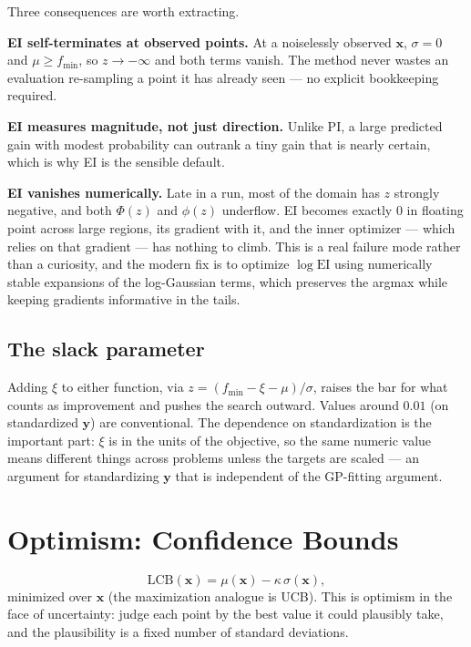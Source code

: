 \documentclass[conference]{IEEEtran}
\begin{document}
Three consequences are worth extracting.

\textbf{EI self-terminates at observed points.} At a noiselessly observed $\mathbf{x}$, $\sigma = 0$ and $\mu \geq f_{\min}$, so $z \to -\infty$ and both terms vanish. The method never wastes an evaluation re-sampling a point it has already seen --- no explicit bookkeeping required.

\textbf{EI measures magnitude, not just direction.} Unlike PI, a large predicted gain with modest probability can outrank a tiny gain that is nearly certain, which is why EI is the sensible default.

\textbf{EI vanishes numerically.} Late in a run, most of the domain has $z$ strongly negative, and both $\Phi(z)$ and $\phi(z)$ underflow. EI becomes exactly $0$ in floating point across large regions, its gradient with it, and the inner optimizer --- which relies on that gradient --- has nothing to climb. This is a real failure mode rather than a curiosity, and the modern fix is to optimize $\log \mathrm{EI}$ using numerically stable expansions of the log-Gaussian terms, which preserves the argmax while keeping gradients informative in the tails.

\subsection*{The slack parameter}
Adding $\xi$ to either function, via $z = (f_{\min} - \xi - \mu)/\sigma$, raises the bar for what counts as improvement and pushes the search outward. Values around $0.01$ (on standardized $\mathbf{y}$) are conventional. The dependence on standardization is the important part: $\xi$ is in the units of the objective, so the same numeric value means different things across problems unless the targets are scaled --- an argument for standardizing $\mathbf{y}$ that is independent of the GP-fitting argument.

\section*{Optimism: Confidence Bounds}
\begin{equation}
    \mathrm{LCB}(\mathbf{x}) = \mu(\mathbf{x}) - \kappa\,\sigma(\mathbf{x}),
\end{equation}
minimized over $\mathbf{x}$ (the maximization analogue is UCB). This is optimism in the face of uncertainty: judge each point by the best value it could plausibly take, and the plausibility is a fixed number of standard deviations.
\end{document}
